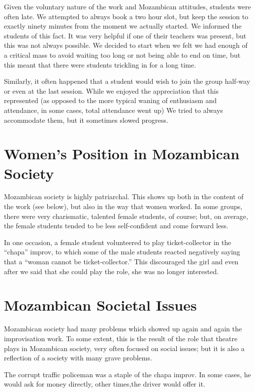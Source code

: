 \documentclass[article,twocolumn,twoside]{memoir}
\begin{document}
Given the voluntary nature of the work and Mozambican attitudes, students were
often late. We attempted to always book a two hour slot, but keep the session
to exactly ninety minutes from the moment we actually started. We informed the
students of this fact. It was very helpful if one of their teachers was
present, but this was not always possible. We decided to start when we felt we
had enough of a critical mass to avoid waiting too long or not being able to
end on time, but this meant that there were students trickling in for a long
time.

Similarly, it often happened that a student would wish to join the group
half-way or even at the last session. While we enjoyed the appreciation that
this represented (as opposed to the more typical waning of enthusiasm and
attendance, in some cases, total attendance went up) We tried to always
accommodate them, but it sometimes slowed progress.

\section{Women's Position in Mozambican Society}

Mozambican society is highly patriarchal. This shows up both in the content
of the work (see below), but also in the way that women worked. In some groups,
there were very charismatic, talented female students, of course; but, on
average, the female students tended to be less self-confident and come forward
less.

In one occasion, a female student volunteered to play ticket-collector in the
``chapa'' improv, to which some of the male students reacted negatively saying
that a ``woman cannot be ticket-collector.'' This discouraged the girl and even
after we said that she could play the role, she was no longer interested.

\section{Mozambican Societal Issues}

Mozambican society had many problems which showed up again and again the
improvisation work. To some extent, this is the result of the role that theatre
plays in Mozambican society, very often focused on social issues; but it is
also a reflection of a society with many grave problems.

The corrupt traffic policeman was a staple of the chapa improv. In some cases,
he would ask for money directly, other times,the driver would offer it.
\end{document}
